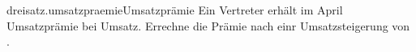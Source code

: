 \begin{exercise}{dreisatz.umsatzpraemie}{Umsatzprämie}
  \ifproblem\problem
    Ein Vertreter erhält im April  Umsatzprämie bei 
    Umsatz. Errechne die Prämie nach einr Umsatzsteigerung von .
  \fi
\end{exercise}
